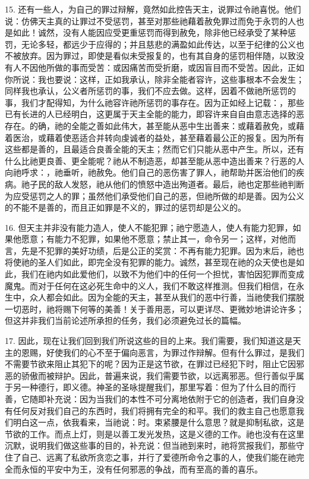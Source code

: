 15. 还有一些人，为自己的罪过辩解，竟然如此控告天主，说罪过令祂喜悦。他们说：仿佛天主真的让罪过不受惩罚，甚至对那些祂藉着赦免罪过而免于永罚的人也是如此！诚然，没有人能因应受更重惩罚而得到赦免，除非他已经承受了某种惩罚，无论多轻，都远少于应得的；并且慈悲的满盈如此传达，以至于纪律的公义也不被放弃。因为罪过，即使是看似未受报复的，也有其自身的惩罚相伴随，以致没有人不因他所做的事而受苦：或因痛苦而受折磨，或因盲目而不受苦。因此，正如你所说：我也要说：这样，正如我承认，除非全能者容许，这些事根本不会发生；同样我也承认，公义者所惩罚的事，我们不应去做。这样，因着不做祂所惩罚的事，我们才配得知，为什么祂容许祂所惩罚的事存在。因为正如经上记载：，那些已有长进的人已经明白，这更属于天主全能的能力，即容许来自自由意志选择的恶存在。的确，祂的全能之善如此伟大，甚至能从恶中生出善来：或藉着赦免，或藉着医治，或藉着使恶适合并转向虔诚者的益处，甚至藉着最公正的报复。因为所有这些都是善的，且最适合良善全能的天主；然而它们只能从恶中产生。所以，还有什么比祂更良善、更全能呢？祂从不制造恶，却甚至能从恶中造出善来？行恶的人向祂呼求：，祂垂听，祂赦免。他们自己的恶伤害了罪人，祂帮助并医治他们的疾病。祂子民的敌人发怒，祂从他们的愤怒中造出殉道者。最后，祂也定那些祂判断为应受惩罚之人的罪；虽然他们承受他们自己的恶，但祂所做的却是善。因为公义的不能不是善的，而且正如罪是不义的，罪过的惩罚却是公义的。\par

16. 但天主并非没有能力造人，使人不能犯罪；祂宁愿造人，使人有能力犯罪，如果他愿意；有能力不犯罪，如果他不愿意；禁止其一，命令另一；这样，对他而言，先是不犯罪的美好功绩，后是公正的奖赏：不再有能力犯罪。因为末后，祂也将使祂的圣人们如此，即完全没有犯罪的能力。诚然，甚至现在祂的众天使也是如此，我们在祂内如此爱他们，以致不为他们中的任何一个担忧，害怕因犯罪而变成魔鬼。而对于任何在这必死生命中的义人，我们不敢这样推测。但我们相信，在永生中，众人都会如此。因为全能的天主，甚至从我们的恶中行善，当祂使我们摆脱一切恶时，祂将赐下何等的美善！关于善用恶，可以更详尽、更微妙地讲论许多；但这并非我们当前论述所承担的任务，我们必须避免过长的篇幅。\par

17. 因此，现在让我们回到我们所说这些的目的上来。我们需要，我们知道这是天主的恩赐，好使我们的心不至于偏向恶言，为罪过作辩解。但有什么罪过，是我们不需要节欲来阻止其犯下的呢？因为正是这节欲，在罪过已经犯下时，阻止它因邪恶的骄傲而被辩护。因此，普遍来说，我们需要节欲，以远离邪恶。但行善似乎属于另一种德行，即义德。神圣的圣咏提醒我们，那里写着：但为了什么目的而行善，它随即补充说：因为当我们的本性不可分离地依附于它的创造者，我们自身没有任何反对我们自己的东西时，我们将拥有完全的和平。我们的救主自己也愿意我们明白这一点，依我看来，当祂说：时。束紧腰是什么意思？就是抑制私欲，这是节欲的工作。而点上灯，则是以善工发光发热，这是义德的工作。祂也没有在这里沉默，说明我们做这些事的目的，补充说：但当祂到来时，祂将赏报我们，那些守住了自己、远离了私欲所贪恋之事，并行了爱德所命令之事的人，使我们能在祂完全而永恒的平安中为王，没有任何邪恶的争战，而有至高的善的喜乐。\par


